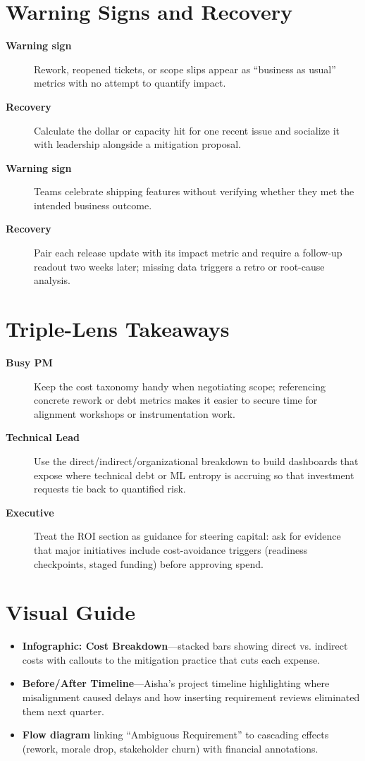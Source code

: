 \section{Warning Signs and Recovery}
\label{sec:costs-warning}
\begin{description}
    \item[\textbf{Warning sign}] Rework, reopened tickets, or scope slips appear as ``business as usual'' metrics with no attempt to quantify impact.
    \item[\textbf{Recovery}] Calculate the dollar or capacity hit for one recent issue and socialize it with leadership alongside a mitigation proposal.
    \item[\textbf{Warning sign}] Teams celebrate shipping features without verifying whether they met the intended business outcome.
    \item[\textbf{Recovery}] Pair each release update with its impact metric and require a follow-up readout two weeks later; missing data triggers a retro or root-cause analysis.
\end{description}

\section{Triple-Lens Takeaways}
\label{sec:costs-triple}

\begin{description}
    \item[\textbf{Busy PM}] Keep the cost taxonomy handy when negotiating scope; referencing concrete rework or debt metrics makes it easier to secure time for alignment workshops or instrumentation work.
    \item[\textbf{Technical Lead}] Use the direct/indirect/organizational breakdown to build dashboards that expose where technical debt or ML entropy is accruing so that investment requests tie back to quantified risk.
    \item[\textbf{Executive}] Treat the ROI section as guidance for steering capital: ask for evidence that major initiatives include cost-avoidance triggers (readiness checkpoints, staged funding) before approving spend.
\end{description}
\section{Visual Guide}
\label{sec:costs-visuals}
\begin{itemize}
    \item \textbf{Infographic: Cost Breakdown}—stacked bars showing direct vs. indirect costs with callouts to the mitigation practice that cuts each expense.
    \item \textbf{Before/After Timeline}—Aisha’s project timeline highlighting where misalignment caused delays and how inserting requirement reviews eliminated them next quarter.
    \item \textbf{Flow diagram} linking ``Ambiguous Requirement'' to cascading effects (rework, morale drop, stakeholder churn) with financial annotations.
\end{itemize}

